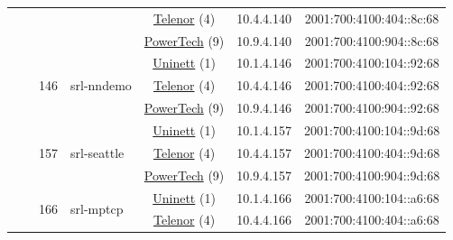 \begin{small}
\begin{center}
\begin{longtable}{|c|c|c|c|c|c|c|c|}
  &  &  &  & \multicolumn{2}{|c|}{\tiny{\href{https://www.telenor.no}{Telenor} (4)}} & \tiny{10.4.4.140} & \tiny{2001:700:4100:404::8c:68} \\* \cline{5-5}\cline{6-6}\cline{7-7}\cline{8-8}
  &  &  &  & \multicolumn{2}{|c|}{\tiny{\href{http://www.powertech.no}{PowerTech} (9)}} & \tiny{10.9.4.140} & \tiny{2001:700:4100:904::8c:68} \\* \cline{3-3}\cline{4-4}\cline{5-5}\cline{6-6}\cline{7-7}\cline{8-8}
  &  & \multirow{3}{*}{\tiny{146}} & \multicolumn{1}{|l|}{\multirow{3}{*}{\tiny{srl-nndemo}}} & \multicolumn{2}{|c|}{\tiny{\href{https://www.uninett.no}{Uninett} (1)}} & \tiny{10.1.4.146} & \tiny{2001:700:4100:104::92:68} \\* \cline{5-5}\cline{6-6}\cline{7-7}\cline{8-8}
  &  &  &  & \multicolumn{2}{|c|}{\tiny{\href{https://www.telenor.no}{Telenor} (4)}} & \tiny{10.4.4.146} & \tiny{2001:700:4100:404::92:68} \\* \cline{5-5}\cline{6-6}\cline{7-7}\cline{8-8}
  &  &  &  & \multicolumn{2}{|c|}{\tiny{\href{http://www.powertech.no}{PowerTech} (9)}} & \tiny{10.9.4.146} & \tiny{2001:700:4100:904::92:68} \\* \cline{3-3}\cline{4-4}\cline{5-5}\cline{6-6}\cline{7-7}\cline{8-8}
  &  & \multirow{3}{*}{\tiny{157}} & \multicolumn{1}{|l|}{\multirow{3}{*}{\tiny{srl-seattle}}} & \multicolumn{2}{|c|}{\tiny{\href{https://www.uninett.no}{Uninett} (1)}} & \tiny{10.1.4.157} & \tiny{2001:700:4100:104::9d:68} \\* \cline{5-5}\cline{6-6}\cline{7-7}\cline{8-8}
  &  &  &  & \multicolumn{2}{|c|}{\tiny{\href{https://www.telenor.no}{Telenor} (4)}} & \tiny{10.4.4.157} & \tiny{2001:700:4100:404::9d:68} \\* \cline{5-5}\cline{6-6}\cline{7-7}\cline{8-8}
  &  &  &  & \multicolumn{2}{|c|}{\tiny{\href{http://www.powertech.no}{PowerTech} (9)}} & \tiny{10.9.4.157} & \tiny{2001:700:4100:904::9d:68} \\* \cline{3-3}\cline{4-4}\cline{5-5}\cline{6-6}\cline{7-7}\cline{8-8}
  &  & \multirow{3}{*}{\tiny{166}} & \multicolumn{1}{|l|}{\multirow{3}{*}{\tiny{srl-mptcp}}} & \multicolumn{2}{|c|}{\tiny{\href{https://www.uninett.no}{Uninett} (1)}} & \tiny{10.1.4.166} & \tiny{2001:700:4100:104::a6:68} \\* \cline{5-5}\cline{6-6}\cline{7-7}\cline{8-8}
  &  &  &  & \multicolumn{2}{|c|}{\tiny{\href{https://www.telenor.no}{Telenor} (4)}} & \tiny{10.4.4.166} & \tiny{2001:700:4100:404::a6:68} \\* \cline{5-5}\cline{6-6}\cline{7-7}\cline{8-8}

\end{longtable}
\end{center}
\end{small}
